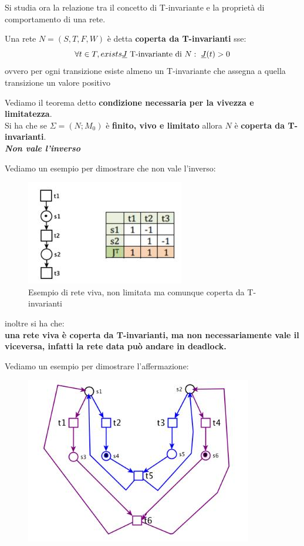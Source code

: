 \documentclass[a4paper,12pt, oneside]{book}
\begin{document}
Si studia ora la relazione tra il concetto di T-invariante e la proprietà di
comportamento di una rete.
\begin{definizione}
  Una rete $N = (S, T , F , W )$ è detta \textbf{coperta da T-invarianti} sse:
  \[\forall t\in T,\,\\exists \underline{J} \mbox{ T-invariante di
    }N:\,\,\underline{J}(t)>0\]
  ovvero per ogni transizione esiste almeno un T-invariante che assegna a quella
  transizione un valore positivo
\end{definizione}
\begin{teorema}
  Vediamo il teorema detto \textbf{condizione necessaria per la vivezza e
    limitatezza}.\\
  Si ha che se $\Sigma=(N;M_0)$ è \textbf{finito, vivo e limitato} allora $N$ è
  \textbf{coperta da T-invarianti}.\\
  \textit{\textbf{Non vale l'inverso}}
  \newpage
  \begin{esempio}
    Vediamo un esempio per dimostrare che non vale l'inverso:
    \begin{figure}[H]
      \centering
      \includegraphics[scale = 0.6]{img/ti7.jpg}
      \caption{Esempio di rete viva, non limitata ma comunque coperta da
        T-invarianti} 
    \end{figure}
  \end{esempio}
  inoltre si ha che: \\
  \textbf{una rete viva è coperta da T-invarianti, ma non
    necessariamente vale il viceversa, infatti la rete data può andare in
    deadlock.}
  \begin{esempio}
    Vediamo un esempio per dimostrare l'affermazione:
    \begin{figure}[H]
      \centering
      \includegraphics[scale = 0.5]{img/ti9.jpg}

\end{figure}
\end{esempio}
\end{teorema}
\end{document}
